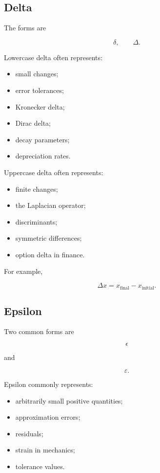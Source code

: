 \subsection{Delta}
\label{subsec:greek-delta}

The forms are

\[
\boxed{
\delta,
\qquad
\Delta.
}
\]

Lowercase delta often represents:

\begin{itemize}
    \item small changes;
    \item error tolerances;
    \item Kronecker delta;
    \item Dirac delta;
    \item decay parameters;
    \item depreciation rates.
\end{itemize}

Uppercase delta often represents:

\begin{itemize}
    \item finite changes;
    \item the Laplacian operator;
    \item discriminants;
    \item symmetric differences;
    \item option delta in finance.
\end{itemize}

For example,

\[
\boxed{
\Delta x
=
x_{\mathrm{final}}
-
x_{\mathrm{initial}}.
}
\]

\subsection{Epsilon}
\label{subsec:greek-epsilon}

Two common forms are

\[
\boxed{
\epsilon
}
\]

and

\[
\boxed{
\varepsilon.
}
\]

Epsilon commonly represents:

\begin{itemize}
    \item arbitrarily small positive quantities;
    \item approximation errors;
    \item residuals;
    \item strain in mechanics;
    \item tolerance values.
\end{itemize}

